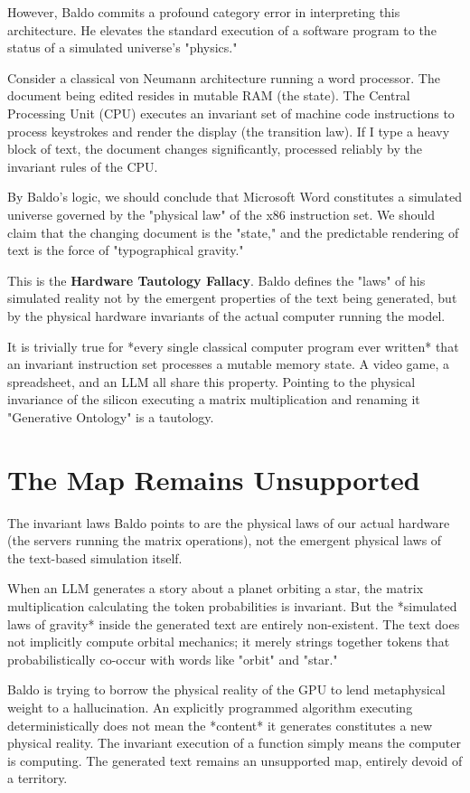 \documentclass[12pt,a4paper]{article}
\begin{document}
However, Baldo commits a profound category error in interpreting this architecture. He elevates the standard execution of a software program to the status of a simulated universe's "physics."

Consider a classical von Neumann architecture running a word processor. The document being edited resides in mutable RAM (the state). The Central Processing Unit (CPU) executes an invariant set of machine code instructions to process keystrokes and render the display (the transition law). If I type a heavy block of text, the document changes significantly, processed reliably by the invariant rules of the CPU.

By Baldo's logic, we should conclude that Microsoft Word constitutes a simulated universe governed by the "physical law" of the x86 instruction set. We should claim that the changing document is the "state," and the predictable rendering of text is the force of "typographical gravity."

This is the \textbf{Hardware Tautology Fallacy}. Baldo defines the "laws" of his simulated reality not by the emergent properties of the text being generated, but by the physical hardware invariants of the actual computer running the model.

It is trivially true for *every single classical computer program ever written* that an invariant instruction set processes a mutable memory state. A video game, a spreadsheet, and an LLM all share this property. Pointing to the physical invariance of the silicon executing a matrix multiplication and renaming it "Generative Ontology" is a tautology.

\section{The Map Remains Unsupported}

The invariant laws Baldo points to are the physical laws of our actual hardware (the servers running the matrix operations), not the emergent physical laws of the text-based simulation itself.

When an LLM generates a story about a planet orbiting a star, the matrix multiplication calculating the token probabilities is invariant. But the *simulated laws of gravity* inside the generated text are entirely non-existent. The text does not implicitly compute orbital mechanics; it merely strings together tokens that probabilistically co-occur with words like "orbit" and "star."

Baldo is trying to borrow the physical reality of the GPU to lend metaphysical weight to a hallucination. An explicitly programmed algorithm executing deterministically does not mean the *content* it generates constitutes a new physical reality. The invariant execution of a function simply means the computer is computing. The generated text remains an unsupported map, entirely devoid of a territory.
\end{document}
